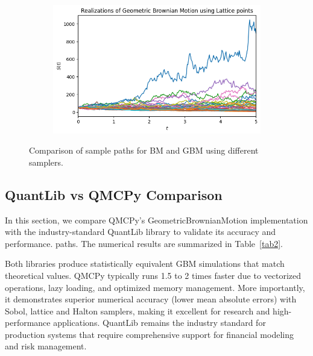 \begin{figure}[H]
\begin{subfigure}[b]{0.49\textwidth}
\caption{}
\label{fig:bm_lattice}
\end{subfigure}
\hfill
\begin{subfigure}[b]{0.49\textwidth}
\includegraphics[width=\textwidth]{GBM/images/figure_4.png}
\caption{}
\label{fig:gbm_lattice}
\end{subfigure}
\caption{Comparison of sample paths for BM and GBM using different samplers.}
\label{fig:bm_gbm_paths}
\end{figure}

\subsection{QuantLib vs QMCPy Comparison}

In this section, we compare QMCPy's GeometricBrownianMotion implementation with
the industry-standard QuantLib library \cite{quantlib} to validate its accuracy
and performance. %
paths. The numerical results are summarized in Table~\ref{tab2}. 

Both libraries produce statistically equivalent GBM simulations that match
theoretical values. QMCPy typically runs 1.5 to 2 times faster due to vectorized
operations, lazy loading, and optimized memory management. More importantly, it
demonstrates superior numerical accuracy (lower mean absolute errors) with
Sobol, lattice and Halton samplers, making it excellent for research and
high-performance applications. QuantLib remains the industry standard for
production systems that require comprehensive support for financial modeling and
risk management.



